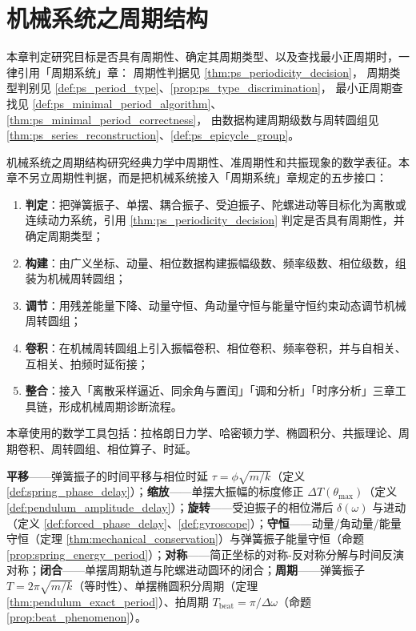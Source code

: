\chapter{机械系统之周期结构}

\begin{remark}[本章目标的周期性判定（引用）]\label{rem:mech_ps_hook}
本章判定研究目标是否具有周期性、确定其周期类型、以及查找最小正周期时，一律引用「周期系统」章：
周期性判据见 \cref{thm:ps_periodicity_decision}，
周期类型判别见 \cref{def:ps_period_type}、\cref{prop:ps_type_discrimination}，
最小正周期查找见 \cref{def:ps_minimal_period_algorithm}、\cref{thm:ps_minimal_period_correctness}，
由数据构建周期级数与周转圆组见 \cref{thm:ps_series_reconstruction}、\cref{def:ps_epicycle_group}。
\end{remark}

\begin{remark}\label{rem:mech_five_steps_positioning}
机械系统之周期结构研究经典力学中周期性、准周期性和共振现象的数学表征。本章不另立周期性判据，而是把机械系统接入「周期系统」章规定的五步接口：
\begin{enumerate}[label=(\arabic*)]
    \item \textbf{判定}：把弹簧振子、单摆、耦合振子、受迫振子、陀螺进动等目标化为离散或连续动力系统，引用 \cref{thm:ps_periodicity_decision} 判定是否具有周期性，并确定周期类型；
    \item \textbf{构建}：由广义坐标、动量、相位数据构建振幅级数、频率级数、相位级数，组装为机械周转圆组；
    \item \textbf{调节}：用残差能量下降、动量守恒、角动量守恒与能量守恒约束动态调节机械周转圆组；
    \item \textbf{卷积}：在机械周转圆组上引入振幅卷积、相位卷积、频率卷积，并与自相关、互相关、拍频时延衔接；
    \item \textbf{整合}：接入「离散采样逼近、同余角与置闰」「调和分析」「时序分析」三章工具链，形成机械周期诊断流程。
\end{enumerate}
本章使用的数学工具包括：拉格朗日力学、哈密顿力学、椭圆积分、共振理论、周期卷积、周转圆组、相位算子、时延。
\end{remark}

\begin{remark}[本章七主题导引]\label{rem:mech_seven_themes}
\textbf{平移}——弹簧振子的时间平移与相位时延 $\tau = \phi\sqrt{m/k}$（定义 \ref{def:spring_phase_delay}）；\textbf{缩放}——单摆大振幅的标度修正 $\Delta T(\theta_{\max})$（定义 \ref{def:pendulum_amplitude_delay}）；\textbf{旋转}——受迫振子的相位滞后 $\delta(\omega)$ 与进动（定义 \ref{def:forced_phase_delay}、\ref{def:gyroscope}）；\textbf{守恒}——动量/角动量/能量守恒（定理 \ref{thm:mechanical_conservation}）与弹簧振子能量守恒（命题 \ref{prop:spring_energy_period}）；\textbf{对称}——简正坐标的对称-反对称分解与时间反演对称；\textbf{闭合}——单摆周期轨道与陀螺进动圆环的闭合；\textbf{周期}——弹簧振子 $T = 2\pi\sqrt{m/k}$（等时性）、单摆椭圆积分周期（定理 \ref{thm:pendulum_exact_period}）、拍周期 $T_{\text{beat}} = \pi/\Delta\omega$（命题 \ref{prop:beat_phenomenon}）。
\end{remark}

